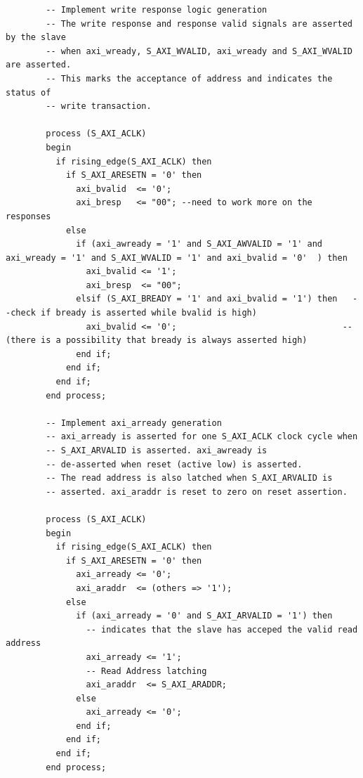 \begin{verbatim}
        -- Implement write response logic generation
        -- The write response and response valid signals are asserted by the slave 
        -- when axi_wready, S_AXI_WVALID, axi_wready and S_AXI_WVALID are asserted.  
        -- This marks the acceptance of address and indicates the status of 
        -- write transaction.
    
        process (S_AXI_ACLK)
        begin
          if rising_edge(S_AXI_ACLK) then 
            if S_AXI_ARESETN = '0' then
              axi_bvalid  <= '0';
              axi_bresp   <= "00"; --need to work more on the responses
            else
              if (axi_awready = '1' and S_AXI_AWVALID = '1' and axi_wready = '1' and S_AXI_WVALID = '1' and axi_bvalid = '0'  ) then
                axi_bvalid <= '1';
                axi_bresp  <= "00"; 
              elsif (S_AXI_BREADY = '1' and axi_bvalid = '1') then   --check if bready is asserted while bvalid is high)
                axi_bvalid <= '0';                                 -- (there is a possibility that bready is always asserted high)
              end if;
            end if;
          end if;                   
        end process; 
    
        -- Implement axi_arready generation
        -- axi_arready is asserted for one S_AXI_ACLK clock cycle when
        -- S_AXI_ARVALID is asserted. axi_awready is 
        -- de-asserted when reset (active low) is asserted. 
        -- The read address is also latched when S_AXI_ARVALID is 
        -- asserted. axi_araddr is reset to zero on reset assertion.
    
        process (S_AXI_ACLK)
        begin
          if rising_edge(S_AXI_ACLK) then 
            if S_AXI_ARESETN = '0' then
              axi_arready <= '0';
              axi_araddr  <= (others => '1');
            else
              if (axi_arready = '0' and S_AXI_ARVALID = '1') then
                -- indicates that the slave has acceped the valid read address
                axi_arready <= '1';
                -- Read Address latching 
                axi_araddr  <= S_AXI_ARADDR;           
              else
                axi_arready <= '0';
              end if;
            end if;
          end if;                   
        end process; 
    

\end{verbatim}
